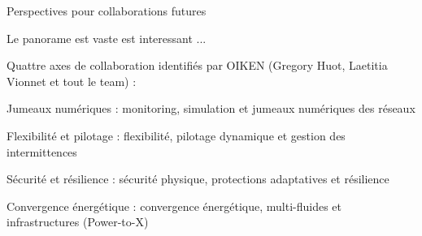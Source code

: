 \documentclass[aspectratio=169,10pt]{beamer}
\newcommand{\kpi}[3][2.9cm]{%
  \begin{tikzpicture}
    \node[fill=wash, rounded corners=4pt, text width=#1, minimum height=2.6cm,
          align=center, inner sep=6pt]
      {{\fontsize{24}{26}\selectfont\bfseries\color{primary}#2}\\[6pt]
       {\footnotesize\color{subtle}#3}};
  \end{tikzpicture}%
}
\begin{document}
%
%
%
%
%


\begin{frame}{Perspectives pour collaborations futures}

  Le panorame est vaste est interessant ...

  \vfill
  Quattre axes de collaboration identifiés par OIKEN (Gregory Huot, Laetitia Vionnet et tout le team) :

  \vfill

  \begin{fitemize}
    \item Jumeaux numériques : monitoring, simulation et jumeaux numériques des réseaux
    \item Flexibilité et pilotage : flexibilité, pilotage dynamique et gestion des intermittences
    \item Sécurité et résilience : sécurité physique, protections adaptatives et résilience
    \item Convergence énergétique : convergence énergétique, multi-fluides et infrastructures (Power-to-X)
  \end{fitemize}
\end{frame}
\end{document}
